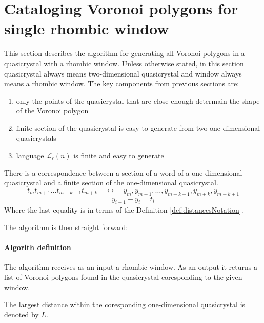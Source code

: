 \documentclass[text.tex]{subfiles}
\begin{document}
\section{Cataloging Voronoi polygons for single rhombic window}
This section describes the algorithm for generating all Voronoi polygons in a quasicrystal with a rhombic window. Unless otherwise stated, in this section quasicrystal always means two-dimensional quasicrystal and window always means a rhombic window. The key components from previous sections are:

\begin{enumerate}
\item only the points of the quasicrystal that are close enough determain the shape of the Voronoi polygon
\item finite section of the quasicrystal is easy to generate from two one-dimensional quasicrystals
\item language $\mathcal{L}_{\ell}(n)$ is finite and easy to generate
\end{enumerate}

There is a correspondence between a section of a word of a one-dimensional quasicrystal and a finite section of the one-dimensional quasicrystal. 
$$t_m t_{m+1}\dots t_{m+k-1} t_{m+k}\quad\longleftrightarrow\quad y_m, y_{m+1},\dots ,y_{m+k-1},y_{m+k},y_{m+k+1}$$
$$y_{i+1}-y_{i} = t_{i}$$
Where the last equality is in terms of the Definition \ref{def:distancesNotation}.

The algorithm is then straight forward:

\paragraph{Algorith definition} The algorithm receives as an input a rhombic window. As an output it returns a list of Voronoi polygons found in the quasicrystal coresponding to the given window.

The largest distance within the coresponding one-dimensional quasicrystal is denoted by $L$. 
\end{document}
